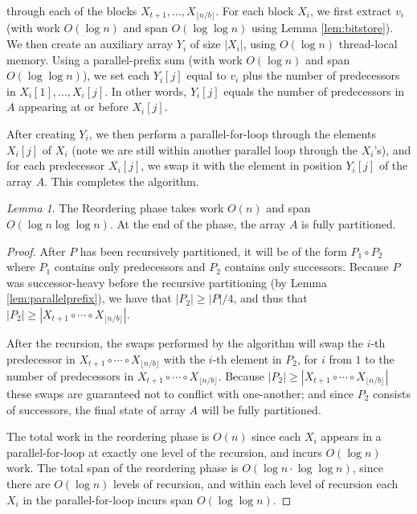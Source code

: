 \documentclass[11pt]{article}
\theoremstyle{remark}
\newtheorem{lemma}[thm]{Lemma}
\theoremstyle{remark}
\begin{document}
through each of the blocks $X_{t + 1}, \ldots, X_{\lfloor n / b \rfloor}$. For each block
$X_i$, we first extract $v_i$ (with work $O(\log n)$ and span $O(\log
\log n)$ using Lemma \ref{lem:bitstore}). We then create an auxiliary
array $Y_i$ of size $|X_i|$, using $O(\log n)$ thread-local
memory. Using a parallel-prefix sum (with work $O(\log n)$ and span
$O(\log \log n)$), we set each $Y_i[j]$ equal to $v_i$ plus the number
of predecessors in $X_i[1], \ldots, X_i[j]$. In other words, $Y_i[j]$
equals the number of predecessors in $A$ appearing at or before
$X_i[j]$.

After creating $Y_i$, we then perform a parallel-for-loop through the
elements $X_i[j]$ of $X_i$ (note we are still within another parallel
loop through the $X_i$'s), and for each predecessor $X_i[j]$, we swap
it with the element in position $Y_i[j]$ of the array $A$. This
completes the algorithm.

\begin{lemma}
 The Reordering phase takes work $O(n)$ and span $O(\log n \log \log
 n)$. At the end of the phase, the array $A$ is fully partitioned.
\end{lemma}
\begin{proof}
  After $P$ has been recursively partitioned, it will be of the form
  $P_1 \circ P_2$ where $P_1$ contains only predecessors and $P_2$
  contains only successors. Because $P$ was successor-heavy before the
  recursive partitioning (by Lemma \ref{lem:parallelprefix}), we have
  that $|P_2| \ge |P| / 4$, and thus that
  $|P_2| \ge |X_{t + 1} \circ \cdots \circ X_{\lfloor n / b
    \rfloor}|$.

After the recursion, the swaps performed by the algorithm will swap
the $i$-th predecessor in $X_{t + 1} \circ \cdots \circ X_{\lfloor n /
  b \rfloor}$ with the $i$-th element in $P_2$, for $i$ from $1$ to
the number of predecessors in $X_{t + 1} \circ \cdots \circ X_{\lfloor
  n / b \rfloor}$. Because $|P_2| \ge |X_{t + 1} \circ \cdots \circ
X_{\lfloor n / b \rfloor}|$ these swaps are guaranteed not to conflict
with one-another; and since $P_2$ consists of successors, the final
state of array $A$ will be fully partitioned.

The total work in the reordering phase is $O(n)$ since each $X_i$
appears in a parallel-for-loop at exactly one level of the recursion,
and incurs $O(\log n)$ work. The total span of the reordering phase is
$O(\log n \cdot \log \log n)$, since there are $O(\log n)$ levels of
recursion, and within each level of recursion each $X_i$ in the
parallel-for-loop incurs span $O(\log \log n)$. 
\end{proof}
\end{document}
